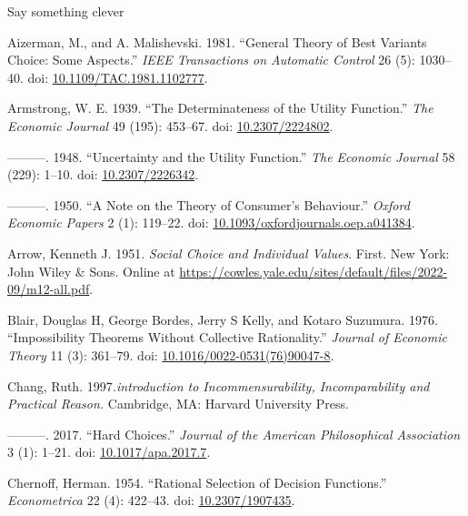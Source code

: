 \documentclass[
  11pt,
  letterpaper,
  DIV=11,
  numbers=noendperiod,
  twoside]{scrartcl}
\newlength{\cslhangindent}
\newenvironment{CSLReferences}[2] %
 {\begin{list}{}{%
  \setlength{\itemindent}{0pt}
  \setlength{\leftmargin}{0pt}
  \setlength{\parsep}{0pt}
  \ifodd #1
   \setlength{\leftmargin}{\cslhangindent}
   \setlength{\itemindent}{-1\cslhangindent}
  \fi
  \setlength{\itemsep}{#2\baselineskip}}}
 {\end{list}}
\begin{document}
Say something clever

\label{refs}
\begin{CSLReferences}{1}{0}
Aizerman, M., and A. Malishevski. 1981. {``General Theory of Best
Variants Choice: Some Aspects.''} \emph{IEEE Transactions on Automatic
Control} 26 (5): 1030--40. doi:
\href{https://doi.org/10.1109/TAC.1981.1102777}{10.1109/TAC.1981.1102777}.

Armstrong, W. E. 1939. {``The Determinateness of the Utility
Function.''} \emph{The Economic Journal} 49 (195): 453--67. doi:
\href{https://doi.org/10.2307/2224802}{10.2307/2224802}.

---------. 1948. {``Uncertainty and the Utility Function.''} \emph{The
Economic Journal} 58 (229): 1--10. doi:
\href{https://doi.org/10.2307/2226342}{10.2307/2226342}.

---------. 1950. {``A Note on the Theory of Consumer's Behaviour.''}
\emph{Oxford Economic Papers} 2 (1): 119--22. doi:
\href{https://doi.org/10.1093/oxfordjournals.oep.a041384}{10.1093/oxfordjournals.oep.a041384}.

Arrow, Kenneth J. 1951. \emph{Social Choice and Individual Values}.
First. New York: John Wiley \& Sons. Online at
\url{https://cowles.yale.edu/sites/default/files/2022-09/m12-all.pdf}.

Blair, Douglas H, George Bordes, Jerry S Kelly, and Kotaro Suzumura.
1976. {``Impossibility Theorems Without Collective Rationality.''}
\emph{Journal of Economic Theory} 11 (3): 361--79. doi:
\href{https://doi.org/10.1016/0022-0531(76)90047-8}{10.1016/0022-0531(76)90047-8}.

Chang, Ruth. 1997\emph{.introduction to Incommensurability,
Incomparability and Practical Reason.} Cambridge, MA: Harvard University
Press.

---------. 2017. {``Hard Choices.''} \emph{Journal of the American
Philosophical Association} 3 (1): 1--21. doi:
\href{https://doi.org/10.1017/apa.2017.7}{10.1017/apa.2017.7}.

Chernoff, Herman. 1954. {``Rational Selection of Decision Functions.''}
\emph{Econometrica} 22 (4): 422--43. doi:
\href{https://doi.org/10.2307/1907435}{10.2307/1907435}.


\end{CSLReferences}
\end{document}
